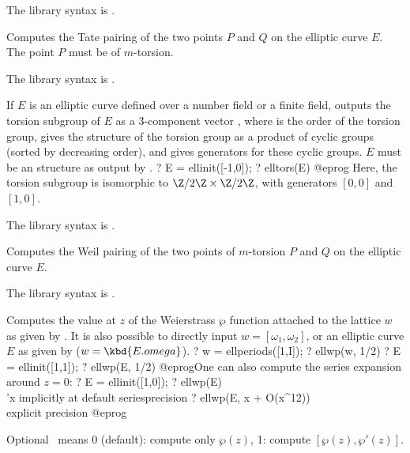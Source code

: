 The library syntax is .

\label{se:elltatepairing}
Computes the Tate pairing of the two points $P$ and $Q$ on the elliptic
curve $E$. The point $P$ must be of $m$-torsion.

The library syntax is .

\label{se:elltors}
If $E$ is an elliptic curve defined over a number field or a finite field,
outputs the torsion subgroup of $E$ as a 3-component vector \kbd{[t,v1,v2]},
where  is the order of the torsion group,  gives the structure
of the torsion group as a product of cyclic groups (sorted by decreasing
order), and  gives generators for these cyclic groups. $E$ must be an
 structure as output by .
\bprog
?  E = ellinit([-1,0]);
?  elltors(E)
@eprog\noindent
Here, the torsion subgroup is isomorphic to $\Z/2\Z \times \Z/2\Z$, with
generators $[0,0]$ and $[1,0]$.

The library syntax is .

\label{se:ellweilpairing}
Computes the Weil pairing of the two points of $m$-torsion $P$ and $Q$
on the elliptic curve $E$.

The library syntax is .

\label{se:ellwp}
Computes the value at $z$ of the Weierstrass $\wp$ function attached to
the lattice $w$ as given by . It is also possible to
directly input $w = [\omega_1,\omega_2]$, or an elliptic curve $E$ as given
by  ($w = \kbd{E.omega}$).
\bprog
? w = ellperiods([1,I]);
? ellwp(w, 1/2)
? E = ellinit([1,1]);
? ellwp(E, 1/2)
@eprog\noindent One can also compute the series expansion around $z = 0$:
\bprog
? E = ellinit([1,0]);
? ellwp(E)              \\ 'x implicitly at default seriesprecision
? ellwp(E, x + O(x^12)) \\ explicit precision
@eprog

Optional \fl\ means 0 (default): compute only $\wp(z)$, 1: compute
$[\wp(z),\wp'(z)]$.

